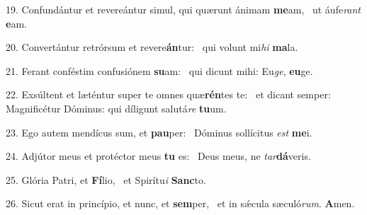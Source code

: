 19. Confundántur et revereántur simul, qui quærunt ánimam \textbf{me}am, \ast\  ut áufe\textit{rant} \textbf{e}am.\

20. Convertántur retrórsum et revere\textbf{án}tur: \ast\  qui volunt mi\textit{hi} \textbf{ma}la.\

21. Ferant conféstim confusiónem \textbf{su}am: \ast\  qui dicunt mihi: Eu\textit{ge}, \textbf{eu}ge.\

22. Exsúltent et læténtur super te omnes quæ\textbf{rén}tes te: \ast\  et dicant semper: Magnificétur Dóminus: qui díligunt salutá\textit{re} \textbf{tu}um.\

23. Ego autem mendícus sum, et \textbf{pau}per: \ast\  Dóminus sollícitus \textit{est} \textbf{me}i.\

24. Adjútor meus et protéctor meus \textbf{tu} es: \ast\  Deus meus, ne \textit{tar}\textbf{dá}veris.\

25. Glória Patri, et \textbf{Fí}lio, \ast\  et Spirítu\textit{i} \textbf{Sanc}to.\

26. Sicut erat in princípio, et nunc, et \textbf{sem}per, \ast\  et in sǽcula sæculó\textit{rum}. \textbf{A}men.\

